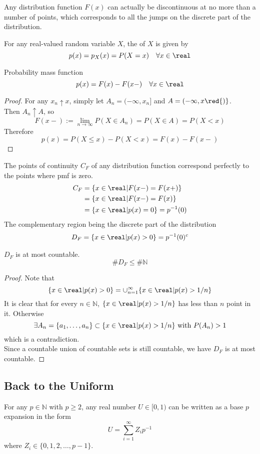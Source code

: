 \documentclass[11pt]{article}
\numberwithin{equation}{section}
\begin{document}
\remark
Any distribution function $F(x)$ can actually be discontinuous at no more than a  number of points, which corresponds to all the jumps on the discrete part of the distribution.

 For any real-valued random variable $X$, the  of $X$ is given by
$$p(x) = p_X(x) = P(X=x) \quad \forall x \in \real$$

\proposition Probability mass function
\begin{equation}
	p(x) = F(x) - F(x-) \quad \forall x \in \real
\end{equation}
\begin{proof}
For any $x_n \uparrow x$, simply let $A_n = (-\infty, x_n]$ and $A=(-\infty, x\red{)}$. \\
Then $A_n \uparrow A$, so 
$$F(x-) := \lim_{n \rightarrow \infty} P(X \in A_n) = P(X \in A) = P(X < x)$$
Therefore
$$p(x) = P(X \leq x) - P(X < x) = F(x) - F(x-)$$ 
\end{proof}

\remark
The points of continuity $C_F$ of any distribution function correspond perfectly to the points where pmf is zero.
\begin{align*}
	C_F &= \{ x \in \real | F(x-) = F(x+) \} \\
	&= \{ x \in \real | F(x-) = F(x) \} \\
	&= \{ x \in \real | p(x) = 0\} = p^{-1}(0)
\end{align*}
The complementary region being the discrete part of the distribution
\begin{align*}
	D_F = \{x \in \real | p(x) > 0\} = p^{-1}(0)^c
\end{align*}

\proposition $D_F$ is at most countable.
$$\# D_F \leq \# \mathbb{N}$$
\begin{proof}
	Note that
	$$\{ x \in \real | p(x) > 0 \} = \cup_{n=1}^\infty \{ x \in \real | p(x) > 1/n\}$$
	It is clear that for every $n \in \mathbb{N}$, $\{ x \in \real | p(x) > 1/n\}$ has less than $n$ point in it. Otherwise
	$$\exists A_n = \{a_1, \hdots, a_n\} \subset \{x \in \real | p(x) > 1/n \} \text{ with } P(A_n) > 1$$
	which is a contradiction.\\
	Since a countable union of countable sets is still countable, we have $D_F$ is at most countable.
\end{proof}

\subsection{Back to the Uniform}
For any $p \in \mathbb{N}$ with $p \geq 2$, any real number $U \in [0, 1)$ can be written as a base $p$ expansion in the form
$$ U = \sum_{i=1}^\infty Z_i p^{-1}$$
where $Z_i \in \{0, 1, 2, \hdots, p-1\}$.
\end{document}

